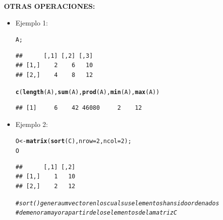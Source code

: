 \documentclass[12pt,letterpaper]{article}\usepackage[]{graphicx}\usepackage[]{color}
\makeatletter
\newcommand{\hlnum}[1]{\textcolor[rgb]{0.686,0.059,0.569}{#1}}%
\newcommand{\hlcom}[1]{\textcolor[rgb]{0.678,0.584,0.686}{\textit{#1}}}%
\newcommand{\hlstd}[1]{\textcolor[rgb]{0.345,0.345,0.345}{#1}}%
\newcommand{\hlkwb}[1]{\textcolor[rgb]{0.69,0.353,0.396}{#1}}%
\newcommand{\hlkwc}[1]{\textcolor[rgb]{0.333,0.667,0.333}{#1}}%
\newcommand{\hlkwd}[1]{\textcolor[rgb]{0.737,0.353,0.396}{\textbf{#1}}}%
\newenvironment{kframe}{%
 \def\at@end@of@kframe{}%
 \ifinner\ifhmode%
  \def\at@end@of@kframe{\end{minipage}}%
  \begin{minipage}{\columnwidth}%
 \fi\fi%
 \def\FrameCommand##1{\hskip\@totalleftmargin \hskip-\fboxsep
 \colorbox{shadecolor}{##1}\hskip-\fboxsep
     \hskip-\linewidth \hskip-\@totalleftmargin \hskip\columnwidth}%
 \MakeFramed {\advance\hsize-\width
   \@totalleftmargin\z@ \linewidth\hsize
   \@setminipage}}%
 {\par\unskip\endMakeFramed%
 \at@end@of@kframe}
\newenvironment{knitrout}{}{} %
\makeatother
\begin{document}
\textbf {OTRAS OPERACIONES:}

\begin{itemize}
\item Ejemplo 1:
\begin{knitrout}
\color{fgcolor}\begin{kframe}
\begin{alltt}
\hlstd{A;}
\end{alltt}
\begin{verbatim}
##      [,1] [,2] [,3]
## [1,]    2    6   10
## [2,]    4    8   12
\end{verbatim}
\begin{alltt}
\hlkwd{c}\hlstd{(}\hlkwd{length}\hlstd{(A),} \hlkwd{sum}\hlstd{(A),} \hlkwd{prod}\hlstd{(A),} \hlkwd{min}\hlstd{(A),} \hlkwd{max}\hlstd{(A))}
\end{alltt}
\begin{verbatim}
## [1]     6    42 46080     2    12
\end{verbatim}
\end{kframe}
\end{knitrout}
\item Ejemplo 2:
\begin{knitrout}
\color{fgcolor}\begin{kframe}
\begin{alltt}
\hlstd{O} \hlkwb{<-} \hlkwd{matrix}\hlstd{(}\hlkwd{sort}\hlstd{(C),} \hlkwc{nrow}\hlstd{=}\hlnum{2}\hlstd{,} \hlkwc{ncol}\hlstd{=}\hlnum{2}\hlstd{);}
\hlstd{O}
\end{alltt}
\begin{verbatim}
##      [,1] [,2]
## [1,]    1   10
## [2,]    2   12
\end{verbatim}
\begin{alltt}
\hlcom{# sort() genera um vector en los cual sus elementos han sido ordenados }
\hlcom{# de menor a mayor a partir de los elementos de la matriz C}
\end{alltt}
\end{kframe}
\end{knitrout}
\end{itemize}
\newpage
\end{document}
